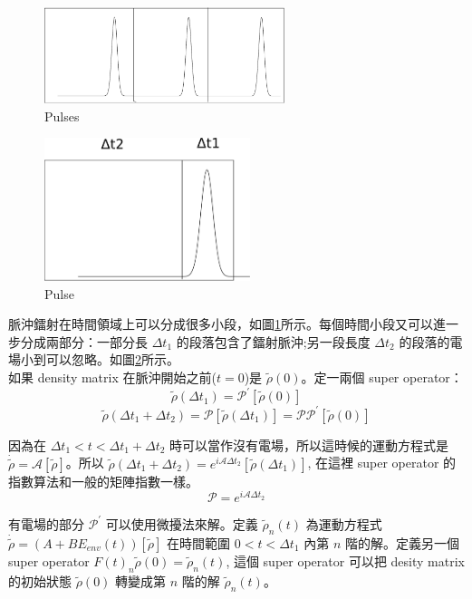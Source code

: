 \documentclass[11pt,a4paper]{article}
\begin{document}
\begin{figure}[H]
\centering
\includegraphics[width=7cm]{pulses.pdf}
\caption{Pulses}
\label{fig:pulses}
\end{figure}
\begin{figure}[H]
\centering
\includegraphics[width=6cm]{pulse.pdf}
\caption{Pulse}
\label{fig:pulse}
\end{figure}

脈沖鐳射在時間領域上可以分成很多小段，如圖\ref{fig:pulses}所示。每個時間小段又可以進一步分成兩部分：一部分長 $\Delta t_1$ 的段落包含了鐳射脈沖;另一段長度 $\Delta t_2$ 的段落的電場小到可以忽略。如圖\ref{fig:pulse}所示。\\

如果 density matrix 在脈沖開始之前($t=0$)是 $\tilde{\rho}(0)$。定一兩個 super operator：\\

\[
\tilde{\rho}(\Delta t_1) = \mathcal{P}^{\prime} \left[ \tilde{\rho}(0) \right]
\]
\[
\tilde{\rho}(\Delta t_1+\Delta t_2) = \mathcal{P} \left[\tilde{\rho}(\Delta t_{1})\right] = \mathcal{P} \mathcal{P}^{\prime} \left[\tilde{\rho}(0)\right]
\]

因為在 $\Delta t_1<t<\Delta t_1+\Delta t_2$ 時可以當作沒有電場，所以這時候的運動方程式是 $\dot{\tilde{\rho}} = \mathcal{A} \left[\tilde{\rho}\right]$。所以 $\tilde{\rho}(\Delta t_1+\Delta t_2) = e^{i \mathcal{A} \Delta t_{2}} \left[ \tilde{\rho}(\Delta t_{1}) \right] $, 在這裡 super operator 的指數算法和一般的矩陣指數一樣。\\

\[
\mathcal{P} = e^{i \mathcal{A} \Delta t_2}
\]

有電場的部分 $\mathcal{P}^{\prime}$ 可以使用微擾法來解。定義 $\tilde{\rho}_n (t)$ 為運動方程式 $\dot{\tilde{\rho}} = \left( A + B E_{env}(t) \right) \left[ \tilde{\rho} \right] $ 在時間範圍 $0< t < \Delta t_{1}$ 內第 $n$ 階的解。定義另一個 super operator $F(t)_{n} \tilde{\rho}(0) = \tilde{\rho}_{n}(t)$, 這個 super operator 可以把 desity matrix 的初始狀態 $\tilde{\rho}(0)$ 轉變成第 $n$ 階的解 $\tilde{\rho}_n (t)$。\\
\end{document}
